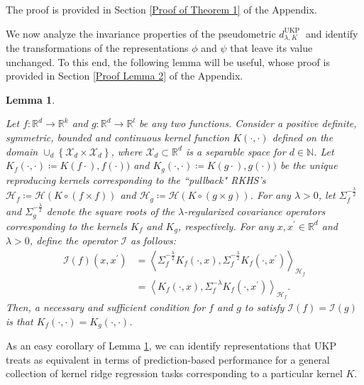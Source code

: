 \documentclass{article}
\theoremstyle{plain}
\newcounter{lemmano}
\newtheorem{lemma}[lemmano]{Lemma}
\newcommand{\R}{\mathbb{R}}
\newcommand{\Hil}{\mathcal{H}}
\newcommand{\repone}{\phi}
\newcommand{\reptwo}{\psi}
\newcommand{\Hf}{\mathcal{H}_{f}}
\newcommand{\Hg}{\mathcal{H}_{g}}
\newcommand{\inprod}[1]{\left \langle #1 \right\rangle}
\newcommand{\metricstname}{UKP }
\begin{document}
The proof is provided in Section \ref{Proof of Theorem 1} of the Appendix.

We now analyze the invariance properties of the pseudometric $d_{\lambda,K}^{\text{\metricstname}}$ and identify the transformations of the representations $\repone$ and $\reptwo$ that leave its value unchanged. To this end, the following lemma will be useful, whose proof is provided in Section \ref{Proof Lemma 2} of the Appendix.

\begin{lemma}\label{Invariance of regularized kernel inner product}

Let $f: \R^d \to \R^k$ and $g: \R^d \to \R^l$ be any two functions. Consider a positive definite, symmetric, bounded and continuous kernel function $K(\cdot,\cdot)$ defined on the domain $\cup_{d} \left\{\mathcal{X}_{d} \times \mathcal{X}_{d}\right\}$, where $\mathcal{X}_{d} \subset \mathbb{R}^{d}$ is a separable space for $d \in \mathbb{N}$. Let $K_{f}(\cdot,\cdot) \coloneq K(f\cdot),f(\cdot))$ and $K_{g}(\cdot,\cdot) \coloneq K(g\cdot),g(\cdot))$ be the unique reproducing kernels corresponding to the ``pullback" RKHS's $\Hf \coloneq \Hil\left(K \circ \left(f \times f\right)\right)$ and $\Hg \coloneq \Hil\left(K \circ \left(g \times g\right)\right)$. For any $\lambda>0$, let $\Sigma_{f}^{-\frac{\lambda}{2}}$ and $\Sigma_{g}^{-\frac{\lambda}{2}}$ denote the square roots of the $\lambda$-regularized covariance operators corresponding to the kernels $K_{f}$ and $K_{g}$, respectively. For any $x,x^{\prime} \in \mathbb{R}^{d}$ and $\lambda>0$, define the operator $\mathcal{I}$ as follows: 
\[
\begin{aligned}
\mathcal{I}(f)(x,x^{\prime}) &= \inprod{\Sigma_{f}^{-\frac{\lambda}{2}}K_{f}(\cdot,x),\Sigma_{f}^{-\frac{\lambda}{2}}K_{f}(\cdot,x^{\prime})}_{\Hf} \\
& = \inprod{K_{f}(\cdot,x),\Sigma_{f}^{-\lambda}K_{f}(\cdot,x^{\prime})}_{\Hf}. 
\end{aligned}
\]
Then, a necessary and sufficient condition for $f$ and $g$ to satisfy $ \mathcal{I}(f) = \mathcal{I}(g)$ is that $ K_{f}(\cdot, \cdot) = K_{g}(\cdot, \cdot)$. 
\end{lemma}

As an easy corollary of Lemma \ref{Invariance of regularized kernel inner product}, we can identify representations that \metricstname treats as equivalent in terms of prediction-based performance for a general collection of kernel ridge regression tasks corresponding to a particular kernel $K$.
\end{document}
